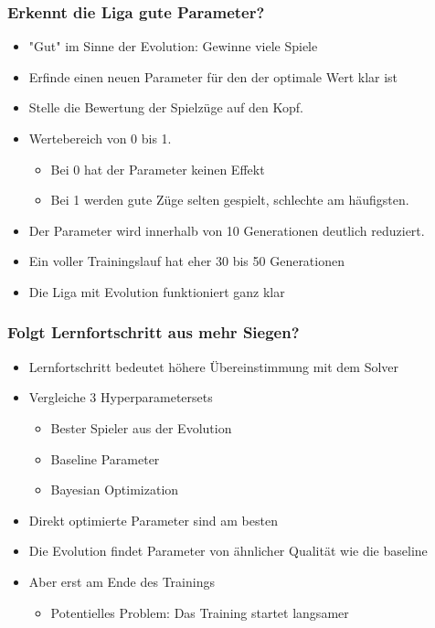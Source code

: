 \begin{frame}
 \frametitle{Erkennt die Liga gute Parameter?}
  


\begin{itemize}
  \item \pause "Gut" im Sinne der Evolution: Gewinne viele Spiele
  \item \pause Erfinde einen neuen Parameter für den der optimale Wert klar ist
  \item \pause Stelle die Bewertung der Spielzüge auf den Kopf.
  \item \pause Wertebereich von 0 bis 1.
\begin{itemize}
  \item \pause Bei 0 hat der Parameter keinen Effekt
  \item \pause Bei 1 werden gute Züge selten gespielt, schlechte am häufigsten.
\end{itemize}
  \item \pause Der Parameter wird innerhalb von 10 Generationen deutlich reduziert.
  \item \pause Ein voller Trainingslauf hat eher 30 bis 50 Generationen
  \item \pause Die Liga mit Evolution funktioniert ganz klar
\end{itemize}

  
\end{frame}
\begin{frame}
 \frametitle{Folgt Lernfortschritt aus mehr Siegen?}
  


\begin{itemize}
  \item \pause Lernfortschritt bedeutet höhere Übereinstimmung mit dem Solver
  \item \pause Vergleiche 3 Hyperparametersets
\begin{itemize}
  \item \pause Bester Spieler aus der Evolution
  \item \pause Baseline Parameter
  \item \pause Bayesian Optimization
\end{itemize}
\end{itemize}

\begin{itemize}
  \item \pause Direkt optimierte Parameter sind am besten
  \item \pause Die Evolution findet Parameter von ähnlicher Qualität wie die baseline
  \item \pause Aber erst am Ende des Trainings
\begin{itemize}
  \item \pause Potentielles Problem: Das Training startet langsamer
\end{itemize}
\end{itemize}

  
\end{frame}
